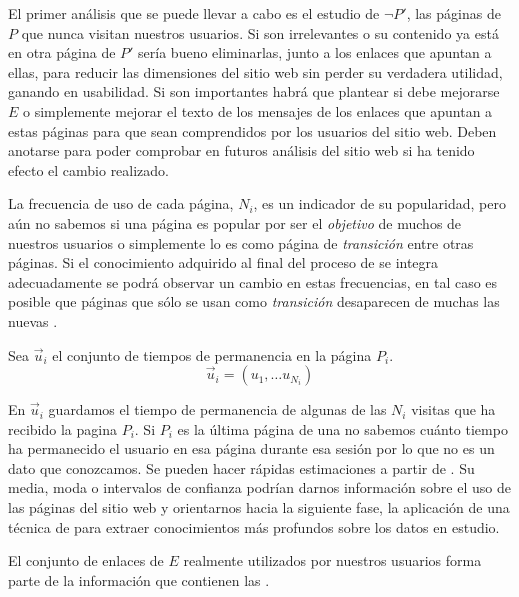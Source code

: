 El primer análisis que se puede llevar a cabo es el estudio de $\neg P'$, las páginas de $P$ que nunca visitan nuestros usuarios. Si son irrelevantes o su contenido ya está en otra página de $P'$ sería bueno eliminarlas, junto a los enlaces que apuntan a ellas, para reducir las dimensiones del sitio web sin perder su verdadera utilidad, ganando en usabilidad. Si son importantes habrá que plantear si debe mejorarse $E$ o simplemente mejorar el texto de los mensajes de los enlaces que apuntan a estas páginas para que sean comprendidos por los usuarios del sitio web. Deben anotarse para poder comprobar en futuros análisis del sitio web si ha tenido efecto el cambio realizado.

La frecuencia de uso de cada página, $N_i$, es un indicador de su popularidad, pero aún no sabemos si una página es popular por ser el \emph{objetivo} de muchos de nuestros usuarios o simplemente lo es como página de \emph{transición} entre otras páginas. Si el conocimiento adquirido al final del proceso de \WUM se integra adecuadamente se podrá observar un cambio en estas frecuencias, en tal caso es posible que páginas que sólo se usan como \emph{transición} desaparecen de muchas las nuevas \sns.

\begin{Definition}\label{def:1-2-4-tiempoPermanencia:paginasVisitadasSW}
   Sea $\overrightarrow{u}_i$ el conjunto de tiempos de permanencia en la página $P_i$.
  \begin{equation}\label{eq:1-2-4-tiempoPermanencia}
    \overrightarrow{u}_i = \left(u_{1}, \ldots u_{N_i}\right)
  \end{equation}
\end{Definition}

En $\overrightarrow{u}_i$ guardamos el tiempo de permanencia de algunas de las $N_i$ visitas que ha recibido la pagina $P_i$. Si $P_i$ es la última página de una \sn no sabemos cuánto tiempo ha permanecido el usuario en esa página durante esa sesión por lo que no es un dato que conozcamos. Se pueden hacer rápidas estimaciones a partir de . Su media, moda o intervalos de confianza podrían darnos información sobre el uso de las páginas del sitio web y orientarnos hacia la siguiente fase, la aplicación de una técnica de \DM para extraer conocimientos más profundos sobre los datos en estudio.

El conjunto de enlaces de $E$ realmente utilizados por nuestros usuarios forma parte de la información que contienen las \sns.

